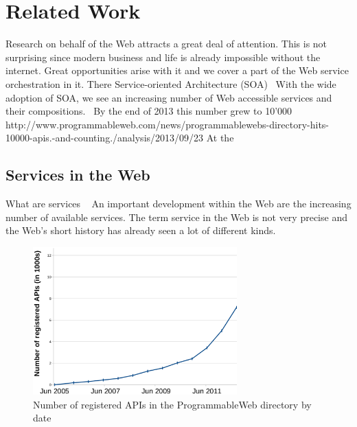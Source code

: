 
\chapter{Related Work}


Research on behalf of the Web attracts a great deal of attention.
This is not surprising since modern business and life is already impossible without the internet.
Great opportunities arise with it and we cover a part of the Web service orchestration in it.
There 
Service-oriented Architecture (SOA)~\cite{perrey2003service}
With the wide adoption of SOA, we see an increasing number of Web accessible services and their compositions.~\cite{conf/icws/HuangFT12}
By the end of 2013 this number grew to 10'000 http://www.programmableweb.com/news/programmablewebs-directory-hits-10000-apis.-and-counting./analysis/2013/09/23
At the 
\section{Services in the Web}
What are services
~\cite{peltz2003web}
An important development within the Web are the increasing number of available services.
The term service in the Web is not very precise and the Web's short history has already seen a lot of different kinds.

\begin{figure}[!ht]
  \centering
  \includegraphics[width=0.7\textwidth]{figures/NumOfAPIs}
  \caption{Number of registered APIs in the ProgrammableWeb directory by date}
  \label{fig:NumOfAPIs}
\end{figure}


